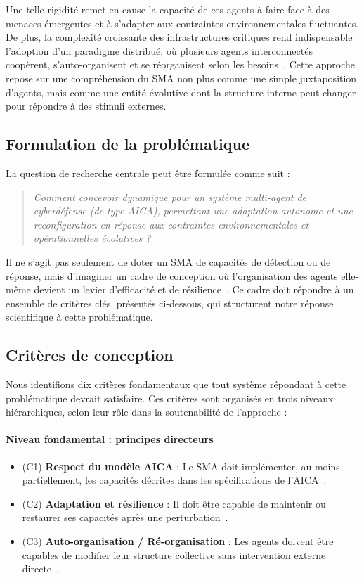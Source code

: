 \documentclass[ twoside,openright,titlepage,numbers=noenddot,headinclude,%
                footinclude=true,cleardoublepage=empty,abstractoff, %
                BCOR=5mm,paper=a4,fontsize=11pt,%
                french,american,%
                ]{scrreprt}
\begin{document}
Une telle rigidité remet en cause la capacité de ces agents à faire face à des menaces émergentes et à s'adapter aux contraintes environnementales fluctuantes. De plus, la complexité croissante des infrastructures critiques rend indispensable l'adoption d'un paradigme distribué, où plusieurs agents interconnectés coopèrent, s'auto-organisent et se réorganisent selon les besoins~\cite{Ferber1999, Gleizes2008}. Cette approche repose sur une compréhension du SMA non plus comme une simple juxtaposition d'agents, mais comme une entité évolutive dont la structure interne peut changer pour répondre à des stimuli externes.

\subsection*{Formulation de la problématique}

La question de recherche centrale peut être formulée comme suit :

\begin{quote}
    \emph{Comment concevoir  dynamique pour un système multi-agent de cyberdéfense (de type AICA), permettant une adaptation autonome et une reconfiguration en réponse aux contraintes environnementales et opérationnelles évolutives ?}
\end{quote}

Il ne s'agit pas seulement de doter un SMA de capacités de détection ou de réponse, mais d'imaginer un cadre de conception où l'organisation des agents elle-même devient un levier d'efficacité et de résilience~\cite{Picard2006, DiMarzoSerugendo2005}. Ce cadre doit répondre à un ensemble de critères clés, présentés ci-dessous, qui structurent notre réponse scientifique à cette problématique.

\subsection*{Critères de conception}

Nous identifions dix critères fondamentaux que tout système répondant à cette problématique devrait satisfaire. Ces critères sont organisés en trois niveaux hiérarchiques, selon leur rôle dans la soutenabilité de l'approche :

\paragraph{Niveau fondamental : principes directeurs}
\begin{itemize}
    \item (C1) \textbf{Respect du modèle AICA} : Le SMA doit implémenter, au moins partiellement, les capacités décrites dans les spécifications de l'AICA~\cite{Kott2018}.
    \item (C2) \textbf{Adaptation et résilience} : Il doit être capable de maintenir ou restaurer ses capacités après une perturbation~\cite{Bodeau2011}.
    \item (C3) \textbf{Auto-organisation / Ré-organisation} : Les agents doivent être capables de modifier leur structure collective sans intervention externe directe~\cite{DiMarzoSerugendo2005}.
\end{itemize}
\end{document}
